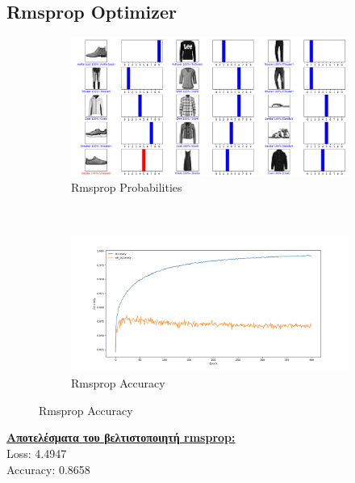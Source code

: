 \documentclass{article}
\begin{document}
\subsection*{Rmsprop Optimizer}
	\begin{figure}[h!]
		\centering
		\begin{subfigure}[t]{0.5\textwidth}
			\centering
			\includegraphics[width=\linewidth]{../exercise3_3/images/fashion_rmsprop_probabilities.png}
			\caption{Rmsprop Probabilities}
		\end{subfigure}%
		~
		\begin{subfigure}[t]{0.5\textwidth}
			\centering
			\includegraphics[width=\linewidth]{../exercise3_3/images/fashion_rmsprop_accuracy.png}
			\caption{Rmsprop Accuracy}
		\end{subfigure}
	\end{figure}
	\noindent
	\textbf{\underline{Aποτελέσματα του βελτιστοποιητή rmsprop:}}\\
	Loss: 4.4947 \\ 
	Accuracy: 0.8658
	
\end{document}
